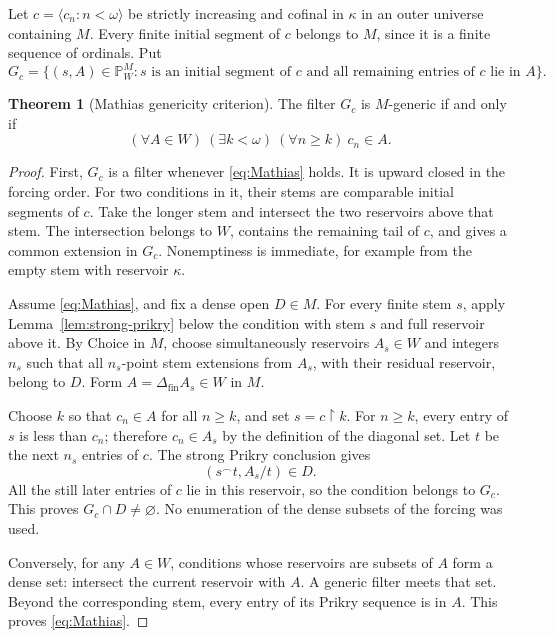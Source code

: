 \documentclass[11pt,letterpaper]{article}
\theoremstyle{definition}
\newtheorem{theorem}[definition]{Theorem}
\numberwithin{equation}{section}
\newcommand{\restr}{\mathbin{\upharpoonright}}
\newcommand{\PP}{\mathbb P}
\newcommand{\fin}{\mathrm{fin}}
\newcommand{\seq}[1]{\langle #1\rangle}
\newcommand{\concat}{\mathbin{{}^{\frown}}}
\begin{document}
Let $c=\seq{c_n:n<\omega}$ be strictly increasing and cofinal in
$\kappa$ in an outer universe containing $M$. Every finite initial
segment of $c$ belongs to $M$, since it is a finite sequence of
ordinals. Put
\begin{equation}\label{eq:Gc}
 G_c=\{(s,A)\in\PP_W^M:s\text{ is an initial segment of }c
          \text{ and all remaining entries of }c\text{ lie in }A\}.
\end{equation}

\begin{theorem}[Mathias genericity criterion]\label{thm:mathias}
The filter $G_c$ is $M$-generic if and only if
\begin{equation}\label{eq:Mathias}
  (\forall A\in W)\ (\exists k<\omega)\ (\forall n\ge k)\ c_n\in A.
\end{equation}
\end{theorem}

\begin{proof}
First, $G_c$ is a filter whenever \eqref{eq:Mathias} holds. It is
upward closed in the forcing order. For two conditions in it, their
stems are comparable initial segments of $c$. Take the longer stem
and intersect the two reservoirs above that stem. The intersection
belongs to $W$, contains the remaining tail of $c$, and gives a common
extension in $G_c$. Nonemptiness is immediate, for example from the
empty stem with reservoir $\kappa$.

Assume \eqref{eq:Mathias}, and fix a dense open $D\in M$. For every
finite stem $s$, apply Lemma~\ref{lem:strong-prikry} below the condition
with stem $s$ and full reservoir above it. By Choice in $M$, choose
simultaneously reservoirs $A_s\in W$ and integers $n_s$ such that all
$n_s$-point stem extensions from $A_s$, with their residual reservoir,
belong to $D$. Form $A=\Delta_{\fin} A_s\in W$ in $M$.

Choose $k$ so that $c_n\in A$ for all $n\ge k$, and set
$s=c\restr k$. For $n\ge k$, every entry of $s$ is less than $c_n$;
therefore $c_n\in A_s$ by the definition of the diagonal set. Let $t$
be the next $n_s$ entries of $c$. The strong Prikry conclusion gives
\[
 (s\concat t,A_s/t)\in D.
\]
All the still later entries of $c$ lie in this reservoir, so the
condition belongs to $G_c$. This proves $G_c\cap D\ne\varnothing$.
No enumeration of the dense subsets of the forcing was used.

Conversely, for any $A\in W$, conditions whose reservoirs are subsets
of $A$ form a dense set: intersect the current reservoir with $A$.
A generic filter meets that set. Beyond the corresponding stem, every
entry of its Prikry sequence is in $A$. This proves
\eqref{eq:Mathias}.
\end{proof}
\end{document}
